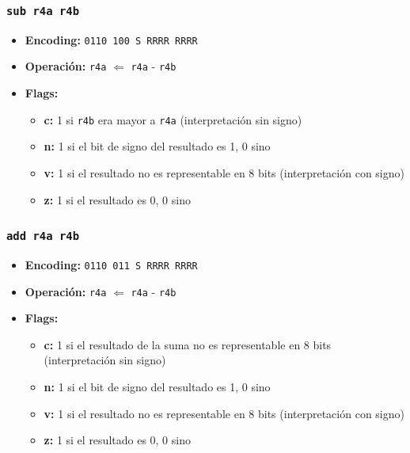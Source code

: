\documentclass{article}
\begin{document}
\subsubsection{\texttt{sub r4a r4b}}
\begin{itemize}
    \item \textbf{Encoding:} \texttt{0110 100 S RRRR RRRR}
    \item \textbf{Operación:} \texttt{r4a} $\Leftarrow$ \texttt{r4a} - \texttt{r4b}
    \item \textbf{Flags:}
        \begin{itemize}
            \item \textbf{c:} 1 si \texttt{r4b} era mayor a \texttt{r4a} (interpretación sin signo)
            \item \textbf{n:} 1 si el bit de signo del resultado es 1, 0 sino
            \item \textbf{v:} 1 si el resultado no es representable en 8 bits (interpretación con signo)
            \item \textbf{z:} 1 si el resultado es 0, 0 sino
        \end{itemize}
\end{itemize}

\subsubsection{\texttt{add r4a r4b}}
\begin{itemize}
    \item \textbf{Encoding:} \texttt{0110 011 S RRRR RRRR}
    \item \textbf{Operación:} \texttt{r4a} $\Leftarrow$ \texttt{r4a} - \texttt{r4b}
    \item \textbf{Flags:}
        \begin{itemize}
            \item \textbf{c:} 1 si el resultado de la suma no es representable en 8 bits (interpretación sin signo)
            \item \textbf{n:} 1 si el bit de signo del resultado es 1, 0 sino
            \item \textbf{v:} 1 si el resultado no es representable en 8 bits (interpretación con signo)
            \item \textbf{z:} 1 si el resultado es 0, 0 sino
        \end{itemize}
\end{itemize}
  
\end{document}
